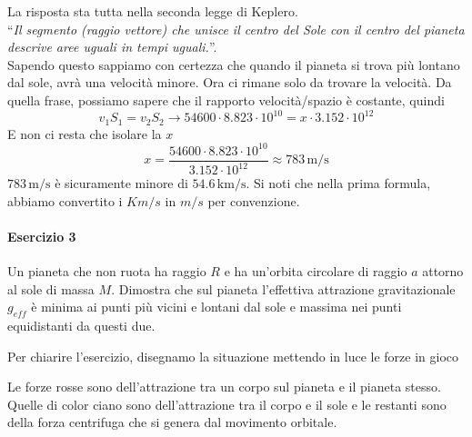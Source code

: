 La risposta sta tutta nella seconda legge di Keplero.\\
``\textit{Il segmento (raggio vettore) che unisce il centro del Sole con il centro del 
pianeta descrive aree uguali in tempi uguali.}''.\\
Sapendo questo sappiamo con certezza che quando il pianeta si trova più lontano dal sole, avrà una
velocità minore. Ora ci rimane solo da trovare la velocità. Da quella frase, possiamo sapere che il
rapporto velocità/spazio è costante, quindi
\begin{equation*}
v_1S_1 = v_2S_2 \rightarrow 54600\cdot8.823\cdot10^{10} = x\cdot3.152\cdot10^{12}
\end{equation*}
E non ci resta che isolare la $x$
\begin{equation*}
x = \frac{54600\cdot8.823\cdot10^{10}}{3.152\cdot10^{12}} \approx \boxed{783\,\text{m/s}}
\end{equation*}
$783\,\text{m/s}$ è sicuramente minore di $54.6\,\text{km/s}$. Si noti che nella prima formula, 
abbiamo convertito i $Km/s$ in $m/s$ per convenzione.

\paragraph{Esercizio 3}
Un pianeta che non ruota ha raggio $R$ e ha un'orbita circolare di raggio $a$ attorno al sole di 
massa $M$. Dimostra che sul pianeta l'effettiva attrazione gravitazionale $g_{eff}$ è minima ai punti 
più vicini e lontani dal sole e massima nei punti equidistanti da questi due.
\divisor

Per chiarire l'esercizio, disegnamo la situazione mettendo in luce le forze in gioco
\begin{center}
\end{center}
Le forze rosse sono dell'attrazione tra un corpo sul pianeta e il pianeta stesso. Quelle di color 
ciano sono dell'attrazione tra il corpo e il sole e le restanti sono della forza centrifuga che si
genera dal movimento orbitale.\\ [\baselineskip]

